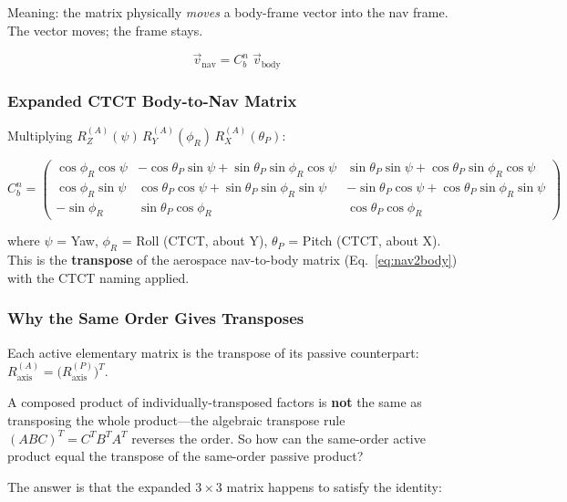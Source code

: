 \documentclass[12pt,a4paper]{article}
\begin{document}
Meaning: the matrix physically \emph{moves} a body-frame vector into the nav
frame.  The vector moves; the frame stays.

\[
  \vec{v}_{\text{nav}} = C_b^n \;\vec{v}_{\text{body}}
\]

\subsubsection*{Expanded CTCT Body-to-Nav Matrix}

Multiplying $R_Z^{(A)}(\psi)\,R_Y^{(A)}(\phi_R)\,R_X^{(A)}(\theta_P)$:

\begin{equation}
\boxed{
  C_b^n =
  \begin{pmatrix}
    \cos\phi_R\cos\psi &
    -\cos\theta_P\sin\psi + \sin\theta_P\sin\phi_R\cos\psi &
    \sin\theta_P\sin\psi + \cos\theta_P\sin\phi_R\cos\psi \\[4pt]
    \cos\phi_R\sin\psi &
    \cos\theta_P\cos\psi + \sin\theta_P\sin\phi_R\sin\psi &
    -\sin\theta_P\cos\psi + \cos\theta_P\sin\phi_R\sin\psi \\[4pt]
    -\sin\phi_R &
    \sin\theta_P\cos\phi_R &
    \cos\theta_P\cos\phi_R
  \end{pmatrix}
}
\label{eq:ctct-body2nav}
\end{equation}

where $\psi$ = Yaw, $\phi_R$ = Roll (CTCT, about Y), $\theta_P$ = Pitch
(CTCT, about X).  This is the \textbf{transpose} of the aerospace
nav-to-body matrix (Eq.~\ref{eq:nav2body}) with the CTCT naming applied.

\subsubsection*{Why the Same Order Gives Transposes}

Each active elementary matrix is the transpose of its passive counterpart:
$R_{\text{axis}}^{(A)} = \bigl(R_{\text{axis}}^{(P)}\bigr)^T$.

A composed product of individually-transposed factors is \textbf{not} the
same as transposing the whole product---the algebraic transpose rule
$(ABC)^T = C^T B^T A^T$ reverses the order.  So how can the same-order
active product equal the transpose of the same-order passive product?

The answer is that the expanded $3\times3$ matrix happens to satisfy the
identity:
\end{document}
